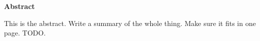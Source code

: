 \newpage
{\Huge \bf Abstract}
\vspace{24pt} 


This is the abstract. Write a summary of the whole thing. Make 
sure it fits in one page. TODO.


\newpage
\vspace*{\fill}
